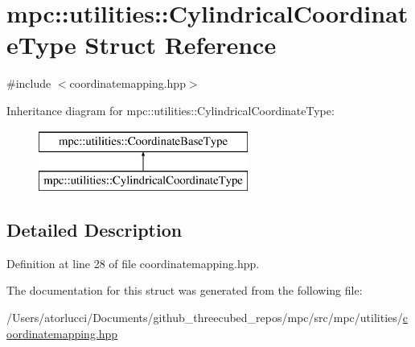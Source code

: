 \hypertarget{structmpc_1_1utilities_1_1_cylindrical_coordinate_type}{}\section{mpc\+:\+:utilities\+:\+:Cylindrical\+Coordinate\+Type Struct Reference}
\label{structmpc_1_1utilities_1_1_cylindrical_coordinate_type}


{\ttfamily \#include $<$coordinatemapping.\+hpp$>$}

Inheritance diagram for mpc\+:\+:utilities\+:\+:Cylindrical\+Coordinate\+Type\+:\begin{figure}[H]
\begin{center}
\leavevmode
\includegraphics[height=2.000000cm]{structmpc_1_1utilities_1_1_cylindrical_coordinate_type}
\end{center}
\end{figure}


\subsection{Detailed Description}


Definition at line 28 of file coordinatemapping.\+hpp.



The documentation for this struct was generated from the following file\+:\begin{DoxyCompactItemize}
\item 
/\+Users/atorlucci/\+Documents/github\+\_\+threecubed\+\_\+repos/mpc/src/mpc/utilities/\mbox{\hyperlink{coordinatemapping_8hpp}{coordinatemapping.\+hpp}}\end{DoxyCompactItemize}

